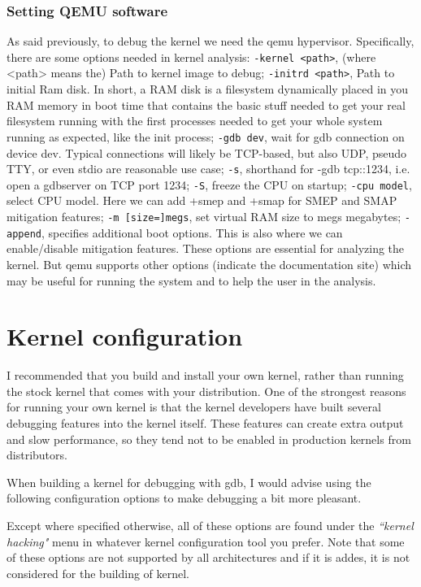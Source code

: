 \documentclass{masterthesis}
\begin{document}
\subsection{Setting QEMU software}
\label{subsect:QEMU}
As said previously, to debug the kernel we need the qemu hypervisor. Specifically, there are some options needed in kernel analysis:
\lstinline{-kernel <path>}, (where <path> means the) Path to kernel image to debug;
\lstinline{-initrd <path>}, Path to initial Ram disk. In short, a RAM disk is a filesystem dynamically placed in you RAM memory in boot time that contains the basic stuff needed to get your real filesystem running with the first processes needed to get your whole system running as expected, like the init process;
\lstinline{-gdb dev}, wait for gdb connection on device dev. Typical connections will likely be TCP-based, but also UDP, pseudo TTY, or even stdio are reasonable use case;
\lstinline{-s}, shorthand for -gdb tcp::1234, i.e. open a gdbserver on TCP port 1234;
\lstinline{-S}, freeze the CPU on startup;
\lstinline{-cpu model}, select CPU model. Here we can add +smep and +smap for SMEP and SMAP mitigation features;
\lstinline{-m [size=]megs}, set virtual RAM size to megs megabytes;
\lstinline{-append}, specifies additional boot options. This is also where we can enable/disable mitigation features.
These options are essential for analyzing the kernel. But qemu supports other options (indicate the documentation site) which may be useful for running the system and to help the user in the analysis.


\chapter{Kernel configuration}
\label{ch:kernel}

I recommended that you build and install your own kernel, rather than running the stock kernel that comes with your distribution. One of the strongest reasons for running your own kernel is that the kernel developers have built several debugging features into the kernel itself. These features can create extra output and slow performance, so they tend not to be enabled in production kernels from distributors.

When building a kernel for debugging with gdb, I would advise using the following configuration options to make debugging a bit more pleasant.

Except where specified otherwise, all of these options are found under the \emph{``kernel hacking"} menu in whatever kernel configuration tool you prefer. Note that some of these options are not supported by all architectures and if it is addes, it is not considered for the building of kernel.
\end{document}
